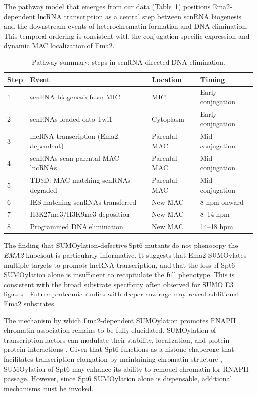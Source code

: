 \documentclass[11pt,a4paper]{article}
\begin{document}
The pathway model that emerges from our data (Table~\ref{tab:pathway}) positions Ema2-dependent lncRNA transcription as a central step between scnRNA biogenesis and the downstream events of heterochromatin formation and DNA elimination. This temporal ordering is consistent with the conjugation-specific expression and dynamic MAC localization of Ema2.

\begin{table}[htbp]
\centering
\caption{Pathway summary: steps in scnRNA-directed DNA elimination.}
\label{tab:pathway}
\begin{tabular}{llll}
\toprule
\textbf{Step} & \textbf{Event} & \textbf{Location} & \textbf{Timing} \\
\midrule
1 & scnRNA biogenesis from MIC & MIC & Early conjugation \\
2 & scnRNAs loaded onto Twi1 & Cytoplasm & Early conjugation \\
3 & lncRNA transcription (Ema2-dependent) & Parental MAC & Mid-conjugation \\
4 & scnRNAs scan parental MAC lncRNAs & Parental MAC & Mid-conjugation \\
5 & TDSD: MAC-matching scnRNAs degraded & Parental MAC & Mid-conjugation \\
6 & IES-matching scnRNAs transferred & New MAC & 8 hpm onward \\
7 & H3K27me3/H3K9me3 deposition & New MAC & 8--14 hpm \\
8 & Programmed DNA elimination & New MAC & 14--18 hpm \\
\bottomrule
\end{tabular}
\end{table}

The finding that SUMOylation-defective Spt6 mutants do not phenocopy the \textit{EMA2} knockout is particularly informative. It suggests that Ema2 SUMOylates multiple targets to promote lncRNA transcription, and that the loss of Spt6 SUMOylation alone is insufficient to recapitulate the full phenotype. This is consistent with the broad substrate specificity often observed for SUMO E3 ligases \citep{Flotho2013, Raman2013}. Future proteomic studies with deeper coverage may reveal additional Ema2 substrates.

The mechanism by which Ema2-dependent SUMOylation promotes RNAPII chromatin association remains to be fully elucidated. SUMOylation of transcription factors can modulate their stability, localization, and protein-protein interactions \citep{Gareau2010}. Given that Spt6 functions as a histone chaperone that facilitates transcription elongation by maintaining chromatin structure \citep{Bortvin1996, Ivanovska2011}, SUMOylation of Spt6 may enhance its ability to remodel chromatin for RNAPII passage. However, since Spt6 SUMOylation alone is dispensable, additional mechanisms must be invoked.
\end{document}
